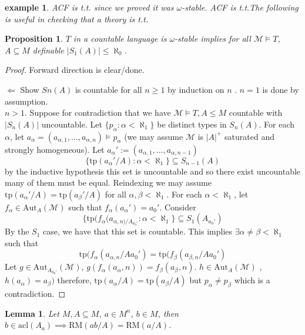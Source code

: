 \documentclass[letterpaper, 12pt]{article}
\newcommand{\fin}{\qquad \quad \hfill \framebox[1.75mm][l]{\,}}
\newcommand{\cM}{\mathcal{M}}
\newcommand{\Aut}{\mbox{Aut}}
\newcommand{\tp}{\mbox{tp}}
\newcommand{\RM}{\mbox{RM}}
\newcommand{\acl}{\mbox{acl}}
\theoremstyle{stdthm}
\newtheorem{lem}[thm]{Lemma}
\newtheorem{prop}[thm]{Proposition}
\theoremstyle{stddef}
\newtheorem{eg}[thm]{example} %
\theoremstyle{stdnonum}
\theoremstyle{stdqands}
\theoremstyle{stdbold}
\begin{document}
\begin{eg}
ACF is t.t. since we proved it was $\omega$-stable. ACF is t.t.The following is useful in checking that a theory is t.t.
\end{eg}

\begin{prop}
$T$ in a countable language is $\omega$-stable implies for all $\cM \models T$, $A\subseteq M$ definable $|S_1(A)| \leq \aleph_0$. 
\end{prop}

\begin{proof}
Forward direction is clear/done. 

$\Leftarrow$ Show $Sn(A)$ is countable for all $n\geq 1$ by induction on $n$ . $n=1$ is done by assumption. \\

$n>1$. Suppose for contradiction that we have $\cM \models T, A\leq M$ countable with $|S_n(A)|$ uncountable. Let $\{p_\alpha: \alpha < \aleph_1\}$ be distinct types in $S_n(A)$. For each $\alpha$, let $a_\alpha = (a_{\alpha,1}, \dots, a_{\alpha,n}) \models p_\alpha$ (we may assume $\cM$ is $|A|^+$ saturated and strongly homogeneous). Let $a_\alpha':=(a_{\alpha,1}, \dots, a_{\alpha,n-1})$ 
\[ \{ \tp(a_\alpha'/A): \alpha < \aleph_1 \} \subseteq S_{n-1}(A) \]
by the inductive hypothesis this set is uncountable and so there exist uncountable many of them must be equal. Reindexing we may assume $\tp(a_\alpha'/A) = \tp(a_\beta'/A)$ for all $\alpha,\beta < \aleph_1$. For each $\alpha < \aleph_1$, let $f_\alpha \in \Aut_A(\cM)$ such that $f_\alpha(a_\alpha') = a_0'$. Consider 
\[ \{\tp(f_\alpha(a_{\alpha,n)/A_{a_0'}}: \alpha < \aleph_1\} \subseteq S_1(A_{a_0'}) \]
By the $S_1$ case, we have that this set is countable. This implies $\exists \alpha \neq \beta < \aleph_1$ such that 
\[ \tp(f_\alpha(a_{\alpha,n}/Aa_0')  = \tp(f_\beta(a_{\beta,n}/Aa_0') \]
Let $g \in \Aut_{A_{a_0'}}(\cM)$, $g(f_\alpha(a_\alpha,n)) = f_\beta(a_\beta, n)$.  $h \in \Aut_A(\cM)$ , $h(a_\alpha) = a_\beta)$ therefore, $\tp(a_\alpha/A) = \tp(a_\beta/A)$ but $p_\alpha \neq p_\beta$ which is a contradiction. 
\end{proof}



\begin{lem}
Let $M,A \subseteq M$, $a \in M^n$, $b \in M$, then $b \in \acl(A_a) \implies \RM(ab/A) = \RM(a/A)$. 
\end{lem}
\end{document}
